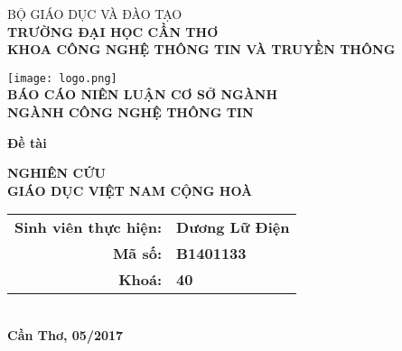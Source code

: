 \documentclass[../thesis.tex]{subfiles}
\begin{document}
\begin{titlepage}

\begin{center}

BỘ GIÁO DỤC VÀ ĐÀO TẠO\\
\textbf{TRƯỜNG ĐẠI HỌC CẦN THƠ\\}
\textbf{KHOA CÔNG NGHỆ THÔNG TIN VÀ TRUYỀN THÔNG\\[1cm]}

\texttt{[image: logo.png]}\\[1cm]

\textbf{BÁO CÁO NIÊN LUẬN CƠ SỞ NGÀNH\\}
\textbf{NGÀNH CÔNG NGHỆ THÔNG TIN\\[2cm]}

\begin{large}
\textbf{Đề tài\\[0.5cm]}
\end{large}
\textbf{{\LARGE NGHIÊN CỨU\\GIÁO DỤC VIỆT NAM CỘNG HOÀ}}
\\[4cm]

\begin{tabular}{ r l }
\textbf{Sinh viên thực hiện:} & \textbf{Dương Lữ Điện}\\ 
\textbf{Mã số:} & \textbf{B1401133}\\  
\textbf{Khoá:} & \textbf{40}   
\end{tabular}
\\[4cm]

\textbf{Cần Thơ, 05/2017}

\end{center}

\end{titlepage}
\end{document}
